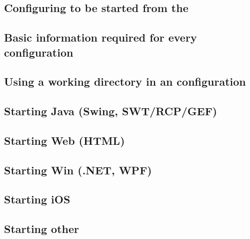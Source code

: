 \subsection{Configuring \gdauts{} to be started from the \ite{}}
\label{configuringaut}


\subsection{Basic information required for every \gdaut{} configuration}
\label{TasksBasicConfigurationInfo}


\subsection{Using a working directory in an \gdaut{} configuration}
\label{TasksWorkingDir}


\subsection{Starting Java \gdauts{} (Swing, SWT/RCP/GEF)}
\label{TasksStartJavaAUT}


\subsection{Starting Web \gdauts{} (HTML)}
\label{TasksStartWebAUT}


\subsection{Starting Win \gdauts{} (.NET, WPF)}
\label{TasksStartWinAUT}
 

\subsection{Starting iOS \gdauts{}}
\label{TasksStartiOSAUT}


\subsection{Starting other \gdauts{}}




